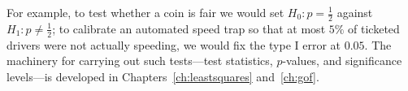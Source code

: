 For example, to test whether a coin is fair we would set $H_0:p=\tfrac12$ against
$H_1:p\neq\tfrac12$; to calibrate an automated speed trap so that at most $5\%$ of
ticketed drivers were not actually speeding, we would fix the type I error at
$0.05$. The machinery for carrying out such tests—test statistics, $p$-values,
and significance levels—is developed in Chapters~\ref{ch:leastsquares}
and~\ref{ch:gof}.

